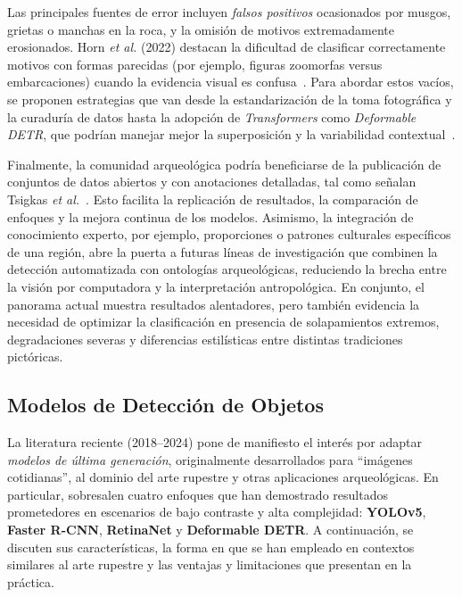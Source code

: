 Las principales fuentes de error incluyen \emph{falsos positivos} ocasionados por musgos, grietas o manchas en la roca, y la omisión de motivos extremadamente erosionados.
Horn \textit{et al.} (2022) destacan la dificultad de clasificar correctamente motivos con formas parecidas (por ejemplo, figuras zoomorfas versus embarcaciones) cuando la evidencia visual es confusa~\cite{horn2022}.
Para abordar estos vacíos, se proponen estrategias que van desde la estandarización de la toma fotográfica y la curaduría de datos hasta la adopción de \textit{Transformers} como \textit{Deformable DETR}, que podrían manejar mejor la superposición y la variabilidad contextual~\cite{zhu2021}.

Finalmente, la comunidad arqueológica podría beneficiarse de la publicación de conjuntos de datos abiertos y con anotaciones detalladas, tal como señalan Tsigkas \textit{et al.}~\cite{tsigkas2020}.
Esto facilita la replicación de resultados, la comparación de enfoques y la mejora continua de los modelos.
Asimismo, la integración de conocimiento experto, por ejemplo, proporciones o patrones culturales específicos de una región, abre la puerta a futuras líneas de investigación que combinen la detección automatizada con ontologías arqueológicas, reduciendo la brecha entre la visión por computadora y la interpretación antropológica.
En conjunto, el panorama actual muestra resultados alentadores, pero también evidencia la necesidad de optimizar la clasificación en presencia de solapamientos extremos, degradaciones severas y diferencias estilísticas entre distintas tradiciones pictóricas.

\subsection{Modelos de Detección de Objetos}

La literatura reciente (2018–2024) pone de manifiesto el interés por adaptar \emph{modelos de última generación}, originalmente desarrollados para “imágenes cotidianas”, al dominio del arte rupestre y otras aplicaciones arqueológicas.
En particular, sobresalen cuatro enfoques que han demostrado resultados prometedores en escenarios de bajo contraste y alta complejidad: \textbf{YOLOv5}, \textbf{Faster R-CNN}, \textbf{RetinaNet} y \textbf{Deformable DETR}.
A continuación, se discuten sus características, la forma en que se han empleado en contextos similares al arte rupestre y las ventajas y limitaciones que presentan en la práctica.

